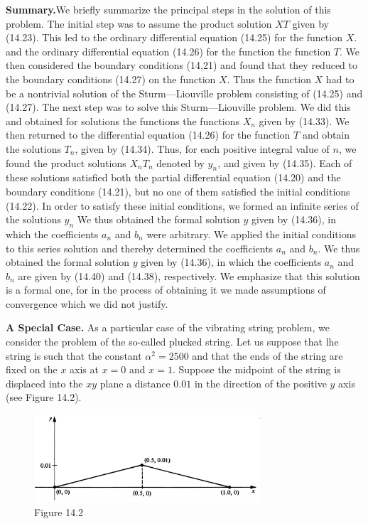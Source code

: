 \documentclass[11pt,a4paper, twoside]{report}
\begin{document}
	\textbf{Summary.}We briefly summarize the principal steps in the solution of this problem. The initial step was to assume the product solution $XT$ given by (14.23). This led to the ordinary differential equation (14.25) for the function $X$. and the ordinary differential equation (14.26) for the function the function $T$. We then considered the boundary conditions (14,21) and found that they reduced to the boundary conditions (14.27) on the function $X$. Thus the function $X$ had to be a nontrivial solution of the Sturm—Liouville problem consisting of (14.25) and (14.27). The next step was to solve this Sturm—Liouville problem. We did this and obtained for solutions the functions the functions $X_n$ given by (14.33). We then returned to the differential equation (14.26) for the function $T$ and obtain the solutions $T_n$, given by (14.34). Thus, for each positive integral value of $n$, we found the product solutions $X_nT_n$ denoted by $y_n$, and given by (14.35). Each of these solutions satisfied both the partial  differential equation (14.20) and the boundary conditions (14.21), but no one of them  satisfied the initial conditions (14.22). In order to satisfy these initial conditions, we formed an infinite series of the solutions $y_n$ We thus obtained the formal solution $y$ given by (14.36), in which the coefficients $a_n$ and $b_n$ were arbitrary. We applied the initial conditions to this series solution and thereby determined the coefficients $a_n$ and $b_n$. We thus obtained the formal solution $y$ given by (14.36), in which the coefficients $a_n$ and $b_n$ are given by (14.40) and (14.38), respectively. We emphasize that this solution is a formal one, for in the process of obtaining it we made assumptions of convergence which we did not justify.\par 
	\textbf{A Special Case.} As a particular case of the vibrating string problem, we consider the problem of the so-called plucked string. Let us suppose that lhe string is such that the constant $\alpha^2 = 2500$ and that the ends of the string are fixed on the $x$ axis at $x = 0$ and $x = 1$. Suppose the midpoint of the string is displaced into the $xy$ plane a distance $0.01$ in the direction of the positive $y$ axis (see Figure 14.2).
	\begin{figure}[H]
		\centering
		\includegraphics[width=0.75\textwidth]{figure/1_page_2.PNG}
		\caption*{Figure 14.2}\label{fig14.2}
	\end{figure}
\end{document}
